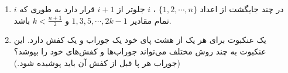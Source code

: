\EXERCISE
\begin{enumerate}
\item
در چند جایگشت از اعداد
$\{1, 2, \cdots, n\}$
،
$i$
جلوتر از
$i + 1$
قرار دارد به طوری که
$i$
تمام مقادیر
$1, 3, 5, \cdots, 2k - 1$
و
$k < \frac{n + 1}{2}$
باشد.
\item
یک عنکبوت برای هر یک از هشت پای خود یک جوراب و یک کفش دارد. این عنکبوت به چند روش مختلف می‌تواند جوراب‌ها و کفش‌های خود را بپوشد؟ (جوراب هر پا قبل از کفش آن باید پوشیده شود.)
\end{enumerate}